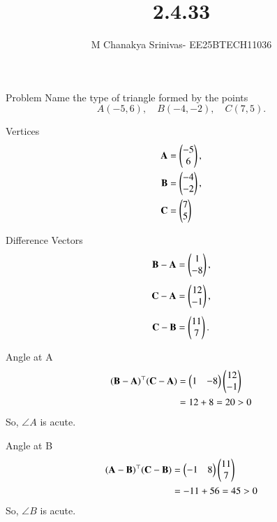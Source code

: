 \documentclass{beamer}
\title %
{2.4.33}
\date{}
\author %
{M Chanakya Srinivas- EE25BTECH11036}
\begin{document}
\frame{\titlepage}


\begin{frame}{Problem}
Name the type of triangle formed by the points
\[
A(-5,6), \quad B(-4,-2), \quad C(7,5).
\]
\end{frame}

\begin{frame}{Vertices}
\begin{align}
\mathbf{A} &= \begin{pmatrix}-5\\6\end{pmatrix}, \nonumber \\
\mathbf{B} &= \begin{pmatrix}-4\\-2\end{pmatrix}, \nonumber \\
\mathbf{C} &= \begin{pmatrix}7\\5\end{pmatrix} \label{eq:vertices}
\end{align}
\end{frame}

\begin{frame}{Difference Vectors}
\begin{align}
\mathbf{B}-\mathbf{A} &= \begin{pmatrix}1\\-8\end{pmatrix}, \label{eq:BA} \\[4pt]
\mathbf{C}-\mathbf{A} &= \begin{pmatrix}12\\-1\end{pmatrix}, \label{eq:CA} \\[4pt]
\mathbf{C}-\mathbf{B} &= \begin{pmatrix}11\\7\end{pmatrix}. \label{eq:CB}
\end{align}
\end{frame}

\begin{frame}{Angle at A}
\begin{align}
(\mathbf{B}-\mathbf{A})^\top(\mathbf{C}-\mathbf{A})
&= \begin{pmatrix}1 & -8\end{pmatrix}\begin{pmatrix}12\\-1\end{pmatrix} \nonumber \\
&= 12+8 = 20 > 0 \label{eq:dotA}
\end{align}
So, $\angle A$ is acute.
\end{frame}

\begin{frame}{Angle at B}
\begin{align}
(\mathbf{A}-\mathbf{B})^\top(\mathbf{C}-\mathbf{B})
&= \begin{pmatrix}-1 & 8\end{pmatrix}\begin{pmatrix}11\\7\end{pmatrix} \nonumber \\
&= -11+56 = 45 > 0 \label{eq:dotB}
\end{align}
So, $\angle B$ is acute.
\end{frame}
\end{document}
